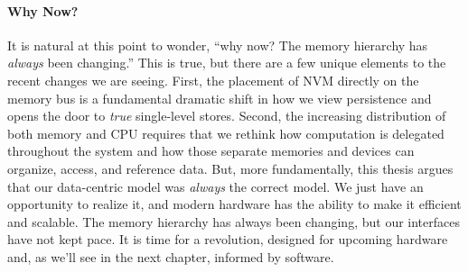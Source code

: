 \begin{chconc}[So, What Does This All Mean?]

    \paragraph{Why Now?}



    It is natural at this point to wonder, ``why now? The memory hierarchy has \emph{always} been changing.'' This is true,
    but there are a few unique elements to the recent changes we are seeing. First, the placement of NVM directly on the
    memory bus is a fundamental dramatic shift in how we view persistence and opens the door to \emph{true} single-level
    stores. Second, the increasing distribution of both memory and CPU requires that we rethink how computation is delegated
    throughout the system and how those separate memories and devices can organize, access, and reference data.
    But, more fundamentally, this thesis argues that our data-centric model was \emph{always} the correct model. We just
    have an opportunity to realize it, and modern hardware has the ability to make it efficient and scalable. The memory
    hierarchy has always been changing, but our interfaces have not kept pace. It is time for a revolution, designed for
    upcoming hardware and, as we'll see in the next chapter, informed by software.


\end{chconc}

